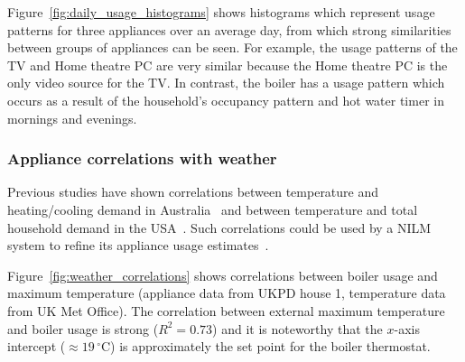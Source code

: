 \documentclass{sig-alternate}
\newcommand{\bluecolor}[1]{\textcolor{blue}{#1}}
\begin{document}
\noindent
Figure~\ref{fig:daily_usage_histograms} shows histograms which represent usage patterns for three appliances over
an average day, from which strong similarities between groups of appliances can be seen.  For
example, the usage patterns of the TV and Home theatre PC are very
similar because the Home theatre PC is the only video source for the TV. In contrast, the boiler has a usage pattern which occurs as a result of the household's occupancy pattern and hot water timer in mornings and evenings.

\subsubsection{Appliance correlations with weather}
\label{sec:weather_correlation}
\noindent
Previous studies have shown correlations
between temperature and heating/cooling demand in
Australia~\cite{RicharddeDear2002} and between temperature and total household demand in the USA~\cite{Kavousian2013a}.  
Such correlations could be used by a NILM system to refine its appliance usage estimates~\cite{wytock_2013}.

Figure~\ref{fig:weather_correlations} shows correlations between
boiler usage and maximum temperature (appliance data from UKPD house 1, temperature data from UK Met Office).  The correlation between
external maximum temperature and boiler usage is strong ($R^2=0.73$) and it is
noteworthy that the $x$-axis intercept ($\approx19\,^{\circ}\mathrm{C}$)
is approximately the set point for the boiler thermostat.

\end{document}

